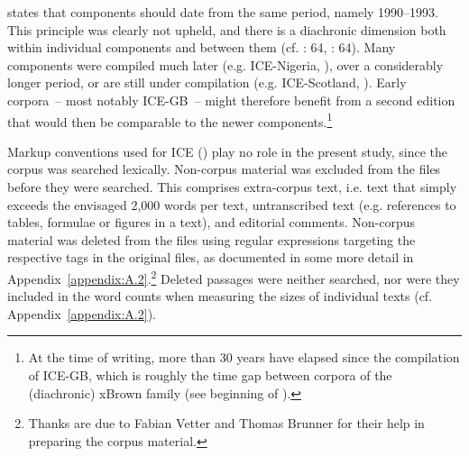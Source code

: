 \citet[173]{Greenbaum1992} states that components should date from the same period, namely 1990–1993. This principle was clearly not upheld, and there is a diachronic dimension both within individual components and between them (cf. \citealt{MukherjeeSchilkBernaisch2010}: 64, \citealt{Bernaisch2015}: 64). Many components were compiled much later (e.g. ICE-Nigeria, \citealt{WunderVoormannGut2010}), over a considerably longer period, or are still under compilation (e.g. ICE-Scotland, \citealt{SchützlerGutFuchs2017}). Early corpora~– most notably ICE-GB~– might therefore benefit from a second edition that would then be comparable to the newer components.\footnote{At the time of writing, more than 30 years have elapsed since the compilation of ICE-GB, which is roughly the time gap between corpora of the (diachronic) xBrown family (see beginning of ).}

\begin{sloppypar}
Markup conventions used for ICE (\citealt{Nelson2002a,Nelson2002b}) play no role in the present study, since the corpus was searched lexically. Non-corpus material \parencites[8–9]{Nelson2002a}[12–13]{Nelson2002b} was excluded from the files before they were searched. This comprises extra-corpus text, i.e. text that simply exceeds the envisaged 2,000 words per text, untranscribed text (e.g. references to tables, formulae or figures in a text), and editorial comments. Non-corpus material was deleted from the files using regular expressions targeting the respective tags in the original files, as documented in some more detail in Appendix~\ref{appendix:A.2}.\footnote{Thanks are due to Fabian Vetter and Thomas Brunner for their help in preparing the corpus material.} Deleted passages were neither searched, nor were they included in the word counts when measuring the sizes of individual texts (cf. Appendix~\ref{appendix:A.2}).
\end{sloppypar}

